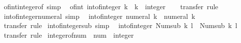 \begin{isabellebody}
\endisatagproof
{\isafoldproof}%
%
\isadelimproof
\isanewline
%
\endisadelimproof
\isanewline
{}\isamarkupfalse%
\ of{\isacharunderscore}{\kern0pt}int{\isacharunderscore}{\kern0pt}integer{\isacharunderscore}{\kern0pt}of\ {\isacharbrackleft}{\kern0pt}simp{\isacharbrackright}{\kern0pt}{\isacharcolon}{\kern0pt}\isanewline
\ \ {\isachardoublequoteopen}of{\isacharunderscore}{\kern0pt}int\ {\isacharparenleft}{\kern0pt}int{\isacharunderscore}{\kern0pt}of{\isacharunderscore}{\kern0pt}integer\ k{\isacharparenright}{\kern0pt}\ {\isacharequal}{\kern0pt}\ {\isacharparenleft}{\kern0pt}k\ {\isacharcolon}{\kern0pt}{\isacharcolon}{\kern0pt}\ integer{\isacharparenright}{\kern0pt}{\isachardoublequoteclose}\isanewline
%
\isadelimproof
\ \ %
\endisadelimproof
%
\isatagproof
{}\isamarkupfalse%
\ transfer\ rule%
\endisatagproof
{\isafoldproof}%
%
\isadelimproof
\isanewline
%
\endisadelimproof
\isanewline
{}\isamarkupfalse%
\ int{\isacharunderscore}{\kern0pt}of{\isacharunderscore}{\kern0pt}integer{\isacharunderscore}{\kern0pt}numeral\ {\isacharbrackleft}{\kern0pt}simp{\isacharbrackright}{\kern0pt}{\isacharcolon}{\kern0pt}\isanewline
\ \ {\isachardoublequoteopen}int{\isacharunderscore}{\kern0pt}of{\isacharunderscore}{\kern0pt}integer\ {\isacharparenleft}{\kern0pt}numeral\ k{\isacharparenright}{\kern0pt}\ {\isacharequal}{\kern0pt}\ numeral\ k{\isachardoublequoteclose}\isanewline
%
\isadelimproof
\ \ %
\endisadelimproof
%
\isatagproof
{}\isamarkupfalse%
\ transfer\ rule%
\endisatagproof
{\isafoldproof}%
%
\isadelimproof
\isanewline
%
\endisadelimproof
\isanewline
{}\isamarkupfalse%
\ int{\isacharunderscore}{\kern0pt}of{\isacharunderscore}{\kern0pt}integer{\isacharunderscore}{\kern0pt}sub\ {\isacharbrackleft}{\kern0pt}simp{\isacharbrackright}{\kern0pt}{\isacharcolon}{\kern0pt}\isanewline
\ \ {\isachardoublequoteopen}int{\isacharunderscore}{\kern0pt}of{\isacharunderscore}{\kern0pt}integer\ {\isacharparenleft}{\kern0pt}Num{\isachardot}{\kern0pt}sub\ k\ l{\isacharparenright}{\kern0pt}\ {\isacharequal}{\kern0pt}\ Num{\isachardot}{\kern0pt}sub\ k\ l{\isachardoublequoteclose}\isanewline
%
\isadelimproof
\ \ %
\endisadelimproof
%
\isatagproof
{}\isamarkupfalse%
\ transfer\ rule%
\endisatagproof
{\isafoldproof}%
%
\isadelimproof
\isanewline
%
\endisadelimproof
\isanewline
{}\isamarkupfalse%
\ integer{\isacharunderscore}{\kern0pt}of{\isacharunderscore}{\kern0pt}num\ {\isacharcolon}{\kern0pt}{\isacharcolon}{\kern0pt}\ {\isachardoublequoteopen}num\ {\isasymRightarrow}\ integer{\isachardoublequoteclose}\isanewline

\end{isabellebody}
